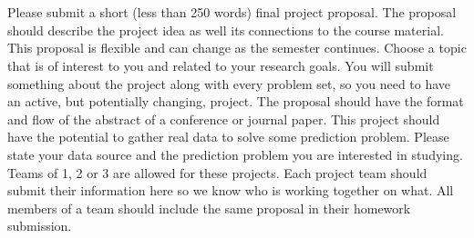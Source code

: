 \documentclass[a4paper]{article}
\begin{document}
\section{}
Please submit a short (less than 250 words) final project proposal.
The proposal should describe the project idea as well its connections to the course material.
This proposal is flexible and can change as the semester continues.
Choose a topic that is of interest to you and related to your research goals.
You will submit something about the project along with every problem set, so you need to have an active, but potentially changing, project.
The proposal should have the format and flow of the abstract of a conference or journal paper.
This project should have the potential to gather real data to solve some prediction problem.
Please state your data source and the prediction problem you are interested in studying.
Teams of 1, 2 or 3 are allowed for these projects. Each project team should submit their information here so we know who is working together on what. All members of a team should include the same proposal in their homework submission.
\end{document}
